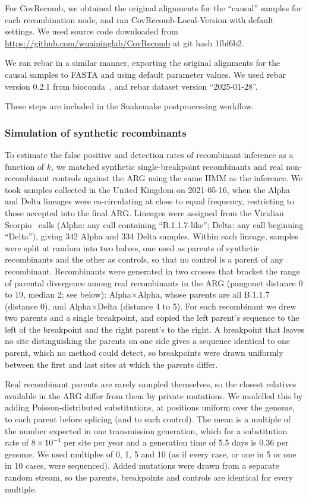 \documentclass[12pt]{article}
\begin{document}
For CovRecomb\cite{Li2024CovRecomb}, we obtained the original alignments
for the ``causal'' samples for each recombination node, and ran
CovRecomb-Local-Version with default settings. We used source code
downloaded from \url{https://github.com/wuaipinglab/CovRecomb} at
git hash 1fbf6b2.

We ran rebar in a similar manner, exporting the original alignments for the
causal samples to FASTA and using default parameter values. We used
rebar version 0.2.1 from bioconda~\cite{Gruning2018bioconda}, and
rebar dataset version ``2025-01-28''.

These steps are included in the Snakemake postprocessing
workflow. %

\subsubsection*{Simulation of synthetic recombinants}
To estimate the false positive and detection rates of recombinant
inference as a function of $k$, we matched synthetic
single-breakpoint recombinants and real non-recombinant controls
against the ARG using the same HMM as the inference.
We took samples collected in the United Kingdom on 2021-05-16,
when the Alpha and Delta lineages were co-circulating at
close to equal frequency, restricting to those accepted into the final ARG.
Lineages were assigned from the Viridian Scorpio~\cite{Colquhoun2023scorpio}
calls (Alpha: any call containing ``B.1.1.7-like''; Delta: any call beginning ``Delta''),
giving 342 Alpha and 334 Delta samples.
Within each lineage, samples were split at random into two halves,
one used as parents of synthetic recombinants and the other as controls,
so that no control is a parent of any recombinant.
Recombinants were generated in two crosses that bracket the range
of parental divergence among real recombinants in the ARG
(pangonet distance 0 to 19, median 2; see below):
Alpha$\times$Alpha, whose parents are all B.1.1.7 (distance 0),
and Alpha$\times$Delta (distance 4 to 5).
For each recombinant we drew two parents and a single breakpoint,
and copied the left parent's sequence to the left of the breakpoint
and the right parent's to the right.
A breakpoint that leaves no site distinguishing the parents on one side
gives a sequence identical to one parent, which no method could detect,
so breakpoints were drawn uniformly between the first and last
sites at which the parents differ.

Real recombinant parents are rarely sampled themselves,
so the closest relatives available in the ARG differ from them by
private mutations.
We modelled this by adding Poisson-distributed substitutions,
at positions uniform over the genome, to each parent before splicing
(and to each control).
The mean is a multiple of the number expected in one transmission generation,
which for a substitution rate of $8 \times 10^{-4}$ per site per year
and a generation time of 5.5 days is 0.36 per genome.
We used multiples of 0, 1, 5 and 10
(as if every case, or one in 5 or one in 10 cases, were sequenced).
Added mutations were drawn from a separate random stream,
so the parents, breakpoints and controls are identical for every multiple.
\end{document}
